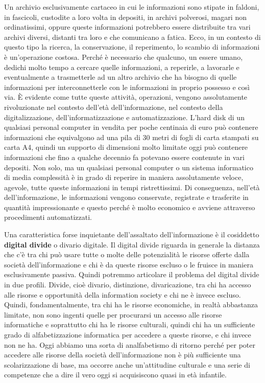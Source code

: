 Un archivio esclusivamente cartaceo in cui le informazioni sono stipate in faldoni, in fascicoli, custodite a loro volta in depositi, in archivi polverosi, magari non ordinatissimi, oppure queste informazioni potrebbero essere distribuite tra vari archivi diversi, distanti tra loro e che comunicano a fatica. Ecco, in un contesto di questo tipo la ricerca, la conservazione, il reperimento, lo scambio di informazioni è un'operazione costosa. Perché è necessario che qualcuno, un essere umano, dedichi molto tempo a cercare quelle informazioni, a reperirle, a lavorarle e eventualmente a trasmetterle ad un altro archivio che ha bisogno di quelle informazioni per interconnetterle con le informazioni in proprio possesso e così via. È evidente come tutte queste attività, operazioni, vengono assolutamente rivoluzionate nel contesto dell'età dell'informazione, nel contesto della digitalizzazione, dell'informatizzazione e automatizzazione. L'hard disk di un qualsiasi personal computer in vendita per poche centinaia di euro può contenere informazioni che equivalgono ad una pila di 30 metri di fogli di carta stampati su carta A4, quindi un supporto di dimensioni molto limitate oggi può contenere informazioni che fino a qualche decennio fa potevano essere contenute in vari depositi. Non solo, ma un qualsiasi personal computer o un sistema informatico di media complessità è in grado di reperire in maniera assolutamente veloce, agevole, tutte queste informazioni in tempi ristrettissimi. Di conseguenza, nell'età dell'informazione, le informazioni vengono conservate, registrate e trasferite in quantità impressionante e questo perché è molto economico e avviene attraverso procedimenti automatizzati. \par
Una caratteristica forse inquietante dell'assaltato dell'informazione è il cosiddetto \textbf{digital divide} o divario digitale. Il digital divide riguarda in generale la distanza che c'è tra chi può usare tutte o molte delle potenzialità le risorse offerte dalla società dell'informazione e chi è da queste risorse escluso o le fruisce in maniera esclusivamente passiva. Quindi potremmo articolare il problema del digital divide in due profili. 
Divide, cioè divario, distinzione, divaricazione, tra chi ha accesso alle risorse e opportunità della information society e chi ne è invece escluso. Quindi, fondamentalmente, tra chi ha le risorse economiche, in realtà abbastanza limitate, non sono ingenti quelle per procurarsi un accesso alle risorse informatiche e soprattutto chi ha le risorse culturali, quindi chi ha un sufficiente grado di alfabetizzazione informatica per accedere a queste risorse, e chi invece non ne ha. Oggi abbiamo una sorta di analfabetismo di ritorno perché per poter accedere alle risorse della società dell'informazione non è più sufficiente una scolarizzazione di base, ma occorre anche un'attitudine culturale e una serie di competenze che a dire il vero oggi si acquisiscono quasi in età infantile.


